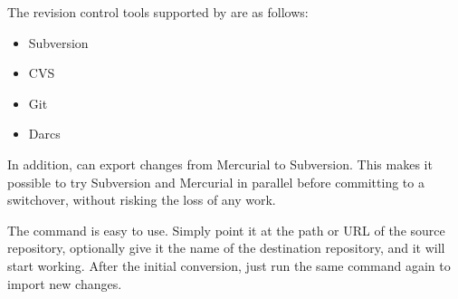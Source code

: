 The revision control tools supported by  are as
follows:
\begin{itemize}
\item Subversion
\item CVS
\item Git
\item Darcs
\end{itemize}

In addition,  can export changes from Mercurial to
Subversion.  This makes it possible to try Subversion and Mercurial in
parallel before committing to a switchover, without risking the loss
of any work.

The  command is easy to use.  Simply point it
at the path or URL of the source repository, optionally give it the
name of the destination repository, and it will start working.  After
the initial conversion, just run the same command again to import new
changes.


